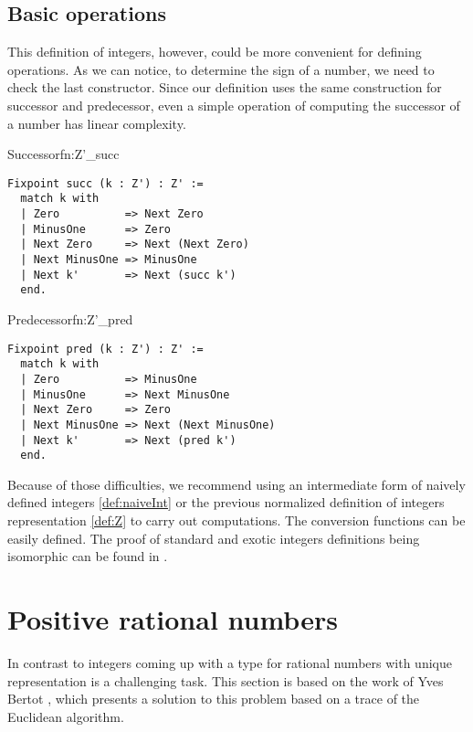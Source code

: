 \subsection{Basic operations}
This definition of integers, however, could be more convenient for defining operations. As we can notice, to determine the sign of a number, we need to check the last constructor. Since our definition uses the same construction for successor and predecessor, even a simple operation of computing the successor of a number has linear complexity.
\begin{func}[D]{Successor}{fn:Z'_succ}
\begin{verbatim}
Fixpoint succ (k : Z') : Z' :=
  match k with
  | Zero          => Next Zero
  | MinusOne      => Zero
  | Next Zero     => Next (Next Zero)
  | Next MinusOne => MinusOne
  | Next k'       => Next (succ k')
  end.
\end{verbatim}
\end{func}
\begin{func}{Predecessor}{fn:Z'_pred}
\begin{verbatim}
Fixpoint pred (k : Z') : Z' :=
  match k with
  | Zero          => MinusOne
  | MinusOne      => Next MinusOne
  | Next Zero     => Zero
  | Next MinusOne => Next (Next MinusOne)
  | Next k'       => Next (pred k')
  end.
\end{verbatim}
\end{func}
Because of those difficulties, we recommend using an intermediate form of naively defined integers \ref{def:naiveInt} or the previous normalized definition of integers representation \ref{def:Z} to carry out computations. The conversion functions can be easily defined. The proof of standard and exotic integers definitions being isomorphic can be found in .
\section{Positive rational numbers}
In contrast to integers coming up with a type for rational numbers with unique representation is a challenging task. This section is based on the work of Yves Bertot \cite{Qplus}, which presents a solution to this problem based on a trace of the Euclidean algorithm.
